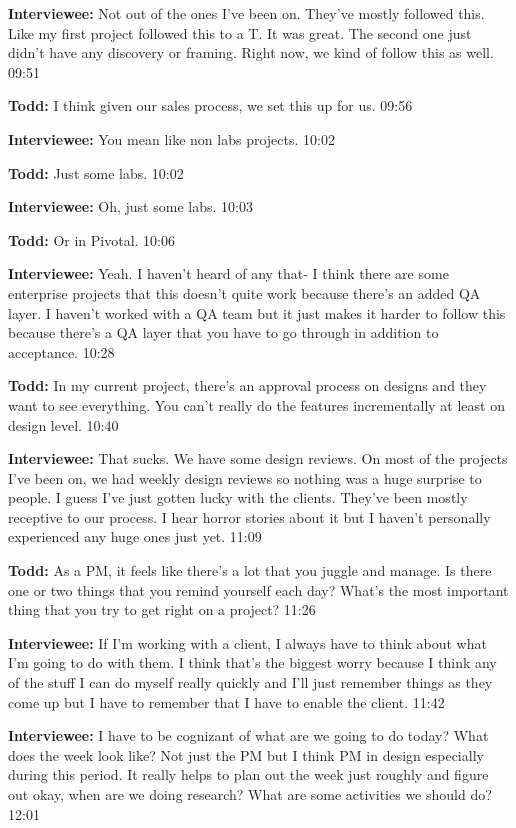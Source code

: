 \textbf{Interviewee:} Not out of the ones I've been on. They've mostly followed this. Like my first project followed this to a T. It was great. The second one just didn't have any discovery or framing. Right now, we kind of follow this as well. 09:51

\textbf{Todd:} I think given our sales process, we set this up for us. 09:56

\textbf{Interviewee:} You mean like non labs projects. 10:02

\textbf{Todd:} Just some labs. 10:02

\textbf{Interviewee:} 	Oh, just some labs. 10:03

\textbf{Todd:} Or in Pivotal. 10:06

\textbf{Interviewee:} Yeah. I haven't heard of any that- I think there are some enterprise projects that this doesn't quite work because there's an added QA layer. I haven't worked with a QA team but it just makes it harder to follow this because there's a QA layer that you have to go through in addition to acceptance. 10:28

\textbf{Todd:} In my current project, there's an approval process on designs and they want to see everything. You can't really do the features incrementally at least on design level. 10:40

\textbf{Interviewee:} That sucks. We have some design reviews. On most of the projects I've been on, we had weekly design reviews so nothing was a huge surprise to people. I guess I've just gotten lucky with the clients. They've been mostly receptive to our process. I hear horror stories about it but I haven't personally experienced any huge ones just yet. 11:09

\textbf{Todd:} As a PM, it feels like there's a lot that you juggle and manage. Is there one or two things that you remind yourself each day? What's the most important thing that you try to get right on a project? 11:26

\textbf{Interviewee:} If I'm working with a client, I always have to think about what I'm going to do with them. I think that's the biggest worry because I think any of the stuff I can do myself really quickly and I'll just remember things as they come up but I have to remember that I have to enable the client. 11:42

\textbf{Interviewee:} I have to be cognizant of what are we going to do today? What does the week look like? Not just the PM but I think PM in design especially during this period. It really helps to plan out the week just roughly and figure out okay, when are we doing research? What are some activities we should do? 12:01

